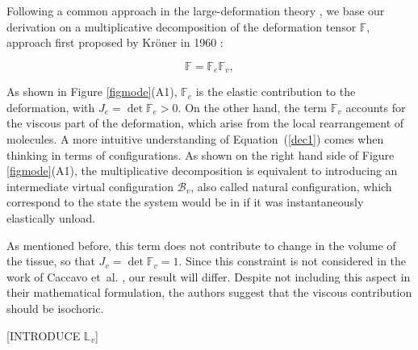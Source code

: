 \documentclass[runningheads]{llncs}
\newcommand{\F}{\ensuremath{\mathbb{F}}}
\newcommand{\LL}{\ensuremath{\mathbb{L}}}
\begin{document}
Following a common approach in the large-deformation theory \cite{Article1,CACCAVO2,Plasto,magneto,NGUYEN,growthtum}, we base our derivation on a multiplicative decomposition of the deformation tensor $\F$, approach first proposed by Kr\"{o}ner in 1960 \cite{kro}:

\begin{equation}
\F=\F_e\F_v,\label{dec1}\tag{A}
\end{equation}

As shown in Figure \ref{figmode}(A1), $\F_e$ is the elastic contribution to the deformation, with $J_e=\det \F_e>0$. On the other hand, the term $\F_v$ accounts for the viscous part of the deformation, which arise from the local rearrangement of molecules. A more intuitive understanding of Equation~(\ref{dec1}) comes when thinking in terms of configurations. As shown on the right hand side of Figure \ref{figmode}(A1), the multiplicative decomposition is equivalent to introducing an intermediate virtual configuration $\mathcal{B}_v$, also called natural configuration, which correspond to the state the system would be in if it was instantaneously elastically unload. 

As mentioned before, this term does not contribute to change in the volume of the tissue, so that $J_v=\det \F_v= 1$. Since this constraint is not considered in the work of Caccavo et~al. \cite{Article1,CACCAVO2}, our result will differ. Despite not including this aspect in their mathematical formulation, the authors suggest that the viscous contribution should be isochoric.

[INTRODUCE $\LL_v$]
 
\end{document}
